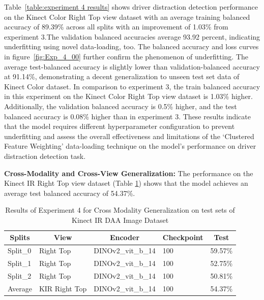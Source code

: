 Table~\ref{table:experiment 4 results} shows driver distraction detection performance on the Kinect Color Right Top view dataset with an average training balanced accuracy of 89.39\% across all splits with an improvement of 1.03\% from experiment 3.The validation balanced accuracies average 93.92 percent,  indicating underfitting using novel data-loading, too. The balanced accuracy and loss curves in figure~\ref{fig:Exp_4_00} further confirm the phenomenon of underfitting. The average test-balanced accuracy is slightly lower than validation-balanced accuracy at 91.14\%, demonstrating a decent generalization to unseen test set data of Kinect Color dataset. In comparison to experiment 3, the train balanced accuracy in this experiment on the Kinect Color Right Top view dataset is 1.03\% higher. Additionally, the validation balanced accuracy is 0.5\% higher, and the test balanced accuracy is 0.08\% higher than in experiment 3. These results indicate that the model requires different hyperparameter configuration to prevent underfitting and assess the overall effectiveness and limitations of the `Clustered Feature Weighting' data-loading technique on the model's performance on driver distraction detection task.    

\textbf{Cross-Modality and Cross-View Generalization:}
The performance on the Kinect IR Right Top view dataset (Table \ref{table:experiment 4 results Cross Modality Generalisation}) shows that the model achieves an average test balanced accuracy of 54.37\%. 
\begin{table}[htbp]
\caption{Results of Experiment 4 for Cross Modality Generalization on test sets of Kinect IR DAA Image Dataset}
\label{table:experiment 4 results Cross Modality Generalisation}
\centering
\begin{tabular}{lllll}
\multicolumn{1}{c}{\textbf{Splits}} & \multicolumn{1}{c}{\textbf{View}} & \multicolumn{1}{c}{\textbf{Encoder}} & \multicolumn{1}{c}{\textbf{Checkpoint}} & \multicolumn{1}{c}{\textbf{Test}}\\
\hline
Split\_0 & Right Top & DINOv2\_vit\_b\_14 & 100 & 59.57\% \\
Split\_1 & Right Top & DINOv2\_vit\_b\_14 & 100 & 52.75\% \\
Split\_2 & Right Top & DINOv2\_vit\_b\_14 & 100 & 50.81\% \\
\hline
Average & KIR Right Top & DINOv2\_vit\_b\_14 & 100 & 54.37\% \\
\hline
\end{tabular}
\end{table}

